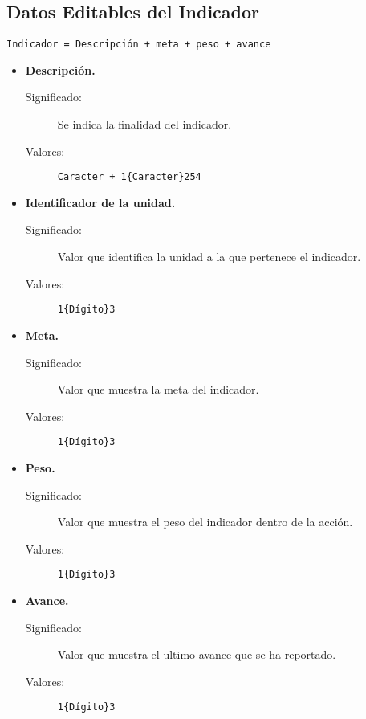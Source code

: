 \subsection{Datos Editables del Indicador}
\label{dd:DatosEditablesIndicador}
\begin{lstlisting}
Indicador = Descripción + meta + peso + avance
\end{lstlisting}
  \begin{itemize}
    \item \textbf{Descripción.}
      \begin{description}
        \item [Significado:] Se indica la finalidad del indicador.
        \item [Valores:]{\begin{lstlisting}
Caracter + 1{Caracter}254\end{lstlisting}}\end{description}

    \item \textbf{Identificador de la unidad.}
      \begin{description}
        \item [Significado:] Valor que identifica la unidad a la que pertenece el indicador.
        \item [Valores:]{\begin{lstlisting}
1{Dígito}3\end{lstlisting}}\end{description}

    \item \textbf{Meta.}
      \begin{description}
        \item [Significado:] Valor que muestra la meta del indicador.
        \item [Valores:]{\begin{lstlisting}
1{Dígito}3\end{lstlisting}}\end{description}

    \item \textbf{Peso.}
      \begin{description}
        \item [Significado:] Valor que muestra el peso del indicador dentro de la acción.
        \item [Valores:]{\begin{lstlisting}
1{Dígito}3\end{lstlisting}}\end{description}

    \item \textbf{Avance.}
      \begin{description}
        \item [Significado:] Valor que muestra el ultimo avance que se ha reportado.
        \item [Valores:]{\begin{lstlisting}
1{Dígito}3\end{lstlisting}}\end{description}
\end{itemize}


